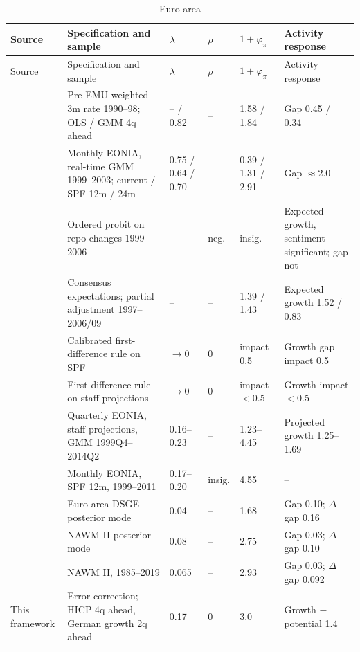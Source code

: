 \documentclass[11pt,a4paper]{article}
\begin{document}
\begin{footnotesize}
\begin{longtable}{@{}L{28mm}L{44mm}L{12mm}L{8mm}L{18mm}L{28mm}@{}}
\caption{Euro area}\\
\toprule
Source & Specification and sample & $\lambda$ & $\rho$ & $1+\varphi_\pi$ & Activity response \\
\midrule
\endfirsthead
\toprule
Source & Specification and sample & $\lambda$ & $\rho$ & $1+\varphi_\pi$ & Activity response \\
\midrule
\endhead
\bottomrule
\endfoot
\textcite{gerlachschnabel2000} & Pre-EMU weighted 3m rate 1990--98; OLS / GMM 4q ahead & -- / 0.82 & -- & 1.58 / 1.84 & Gap 0.45 / 0.34 \\
\textcite{gerdesmeier2004} & Monthly EONIA, real-time GMM 1999--2003; current / SPF 12m / 24m & 0.75 / 0.64 / 0.70 & -- & 0.39 / 1.31 / 2.91 & Gap $\approx$2.0 \\
\textcite{gerlach2007} & Ordered probit on repo changes 1999--2006 & -- & neg. & insig. & Expected growth, sentiment significant; gap not \\
\textcite{gorter2008} & Consensus expectations; partial adjustment 1997--2006/09 & -- & -- & 1.39 / 1.43 & Expected growth 1.52 / 0.83 \\
\textcite{orphanideswieland2013} & Calibrated first-difference rule on SPF & $\to0$ & 0 & impact 0.5 & Growth gap impact 0.5 \\
\textcite{hartmannsmets2018} & First-difference rule on staff projections & $\to0$ & 0 & impact $<$0.5 & Growth impact $<$0.5 \\
\textcite{paloviita2021} & Quarterly EONIA, staff projections, GMM 1999Q4--2014Q2 & 0.16--0.23 & -- & 1.23--4.45 & Projected growth 1.25--1.69 \\
\textcite{gerlachlewis2014} & Monthly EONIA, SPF 12m, 1999--2011 & 0.17--0.20 & insig. & 4.55 & -- \\
\textcite{smetswouters2003} & Euro-area DSGE posterior mode & 0.04 & -- & 1.68 & Gap 0.10; $\Delta$gap 0.16 \\
\textcite{coenen2018} & NAWM II posterior mode & 0.08 & -- & 2.75 & Gap 0.03; $\Delta$gap 0.10 \\
\textcite{darracq2026} & NAWM II, 1985--2019 & 0.065 & -- & 2.93 & Gap 0.03; $\Delta$gap 0.092 \\
This framework & Error-correction; HICP 4q ahead, German growth 2q ahead & 0.17 & 0 & 3.0 & Growth $-$ potential 1.4 \\
\end{longtable}


\end{footnotesize}
\end{document}
